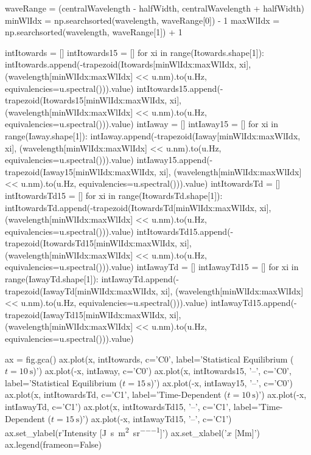 \begin{pycode}[2DRT]
    waveRange = (centralWavelength - halfWidth, centralWavelength + halfWidth)
    minWlIdx = np.searchsorted(wavelength, waveRange[0]) - 1
    maxWlIdx = np.searchsorted(wavelength, waveRange[1]) + 1

    intItowards = []
    intItowards15 = []
    for xi in range(Itowards.shape[1]):
        intItowards.append(-trapezoid(Itowards[minWlIdx:maxWlIdx, xi],
                           (wavelength[minWlIdx:maxWlIdx] << u.nm).to(u.Hz,
                                      equivalencies=u.spectral())).value)
        intItowards15.append(-trapezoid(Itowards15[minWlIdx:maxWlIdx, xi],
                           (wavelength[minWlIdx:maxWlIdx] << u.nm).to(u.Hz,
                                      equivalencies=u.spectral())).value)
    intIaway = []
    intIaway15 = []
    for xi in range(Iaway.shape[1]):
        intIaway.append(-trapezoid(Iaway[minWlIdx:maxWlIdx, xi],
                        (wavelength[minWlIdx:maxWlIdx] << u.nm).to(u.Hz,
                                   equivalencies=u.spectral())).value)
        intIaway15.append(-trapezoid(Iaway15[minWlIdx:maxWlIdx, xi],
                        (wavelength[minWlIdx:maxWlIdx] << u.nm).to(u.Hz,
                                   equivalencies=u.spectral())).value)
    intItowardsTd = []
    intItowardsTd15 = []
    for xi in range(ItowardsTd.shape[1]):
        intItowardsTd.append(-trapezoid(ItowardsTd[minWlIdx:maxWlIdx, xi],
                             (wavelength[minWlIdx:maxWlIdx] << u.nm).to(u.Hz,
                                        equivalencies=u.spectral())).value)
        intItowardsTd15.append(-trapezoid(ItowardsTd15[minWlIdx:maxWlIdx, xi],
                             (wavelength[minWlIdx:maxWlIdx] << u.nm).to(u.Hz,
                                        equivalencies=u.spectral())).value)
    intIawayTd = []
    intIawayTd15 = []
    for xi in range(IawayTd.shape[1]):
        intIawayTd.append(-trapezoid(IawayTd[minWlIdx:maxWlIdx, xi],
                          (wavelength[minWlIdx:maxWlIdx] << u.nm).to(u.Hz,
                                     equivalencies=u.spectral())).value)
        intIawayTd15.append(-trapezoid(IawayTd15[minWlIdx:maxWlIdx, xi],
                          (wavelength[minWlIdx:maxWlIdx] << u.nm).to(u.Hz,
                                     equivalencies=u.spectral())).value)

    ax = fig.gca()
    ax.plot(x, intItowards, c='C0', label='Statistical Equilibrium ($t=\SI{10}{\second}$)')
    ax.plot(-x, intIaway, c='C0')
    ax.plot(x, intItowards15, '--', c='C0', label='Statistical Equilibrium ($t=\SI{15}{\second}$)')
    ax.plot(-x, intIaway15, '--', c='C0')
    ax.plot(x, intItowardsTd, c='C1', label='Time-Dependent ($t=\SI{10}{\second}$)')
    ax.plot(-x, intIawayTd, c='C1')
    ax.plot(x, intItowardsTd15, '--', c='C1', label='Time-Dependent ($t=\SI{15}{\second}$)')
    ax.plot(-x, intIawayTd15, '--', c='C1')
    ax.set_ylabel(r'Intensity [\si{\joule\per\second\per\square\metre\per\steradian}]')
    ax.set_xlabel('$x$ [Mm]')
    ax.legend(frameon=False)



\end{pycode}

